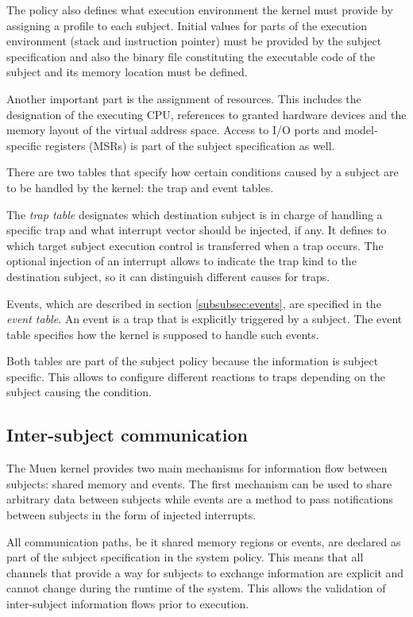 The policy also defines what execution environment the kernel must provide by
assigning a profile to each subject. Initial values for parts of the execution
environment (stack and instruction pointer) must be provided by the subject
specification and also the binary file constituting the executable code of the
subject and its memory location must be defined.

Another important part is the assignment of resources. This includes the
designation of the executing CPU, references to granted hardware devices and the
memory layout of the virtual address space. Access to I/O ports and
model-specific registers (MSRs) is part of the subject specification as well.

There are two tables that specify how certain conditions caused by a subject
are to be handled by the kernel: the trap and event tables.

The \emph{trap table} designates which destination subject is in charge of
handling a specific trap and what interrupt vector should be injected, if any.
It defines to which target subject execution control is transferred when a trap
occurs. The optional injection of an interrupt allows to indicate the trap kind
to the destination subject, so it can distinguish different causes for traps.

Events, which are described in section \ref{subsubsec:events}, are specified in
the \emph{event table}. An event is a trap that is explicitly triggered by a
subject. The event table specifies how the kernel is supposed to handle such
events.

Both tables are part of the subject policy because the information is subject
specific. This allows to configure different reactions to traps depending on the
subject causing the condition.

\subsection{Inter-subject communication}
The Muen kernel provides two main mechanisms for information flow between
subjects: shared memory and events. The first mechanism can be used to share
arbitrary data between subjects while events are a method to pass notifications
between subjects in the form of injected interrupts.

All communication paths, be it shared memory regions or events, are declared as
part of the subject specification in the system policy. This means that all
channels that provide a way for subjects to exchange information are explicit
and cannot change during the runtime of the system. This allows the validation
of inter-subject information flows prior to execution.


